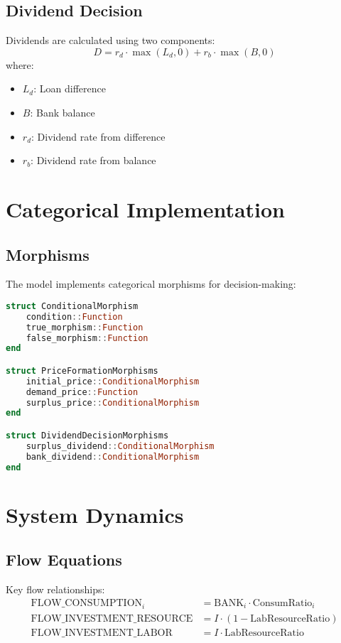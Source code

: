 \documentclass{article}
\begin{document}
\subsection{Dividend Decision}
Dividends are calculated using two components:
\begin{equation}
    D = r_d \cdot \max(L_d, 0) + r_b \cdot \max(B, 0)
\end{equation}
where:
\begin{itemize}
    \item $L_d$: Loan difference
    \item $B$: Bank balance
    \item $r_d$: Dividend rate from difference
    \item $r_b$: Dividend rate from balance
\end{itemize}

\section{Categorical Implementation}

\subsection{Morphisms}
The model implements categorical morphisms for decision-making:

\begin{lstlisting}[language=Julia]
struct ConditionalMorphism
    condition::Function
    true_morphism::Function
    false_morphism::Function
end

struct PriceFormationMorphisms
    initial_price::ConditionalMorphism
    demand_price::Function
    surplus_price::ConditionalMorphism
end

struct DividendDecisionMorphisms
    surplus_dividend::ConditionalMorphism
    bank_dividend::ConditionalMorphism
end
\end{lstlisting}

\section{System Dynamics}

\subsection{Flow Equations}
Key flow relationships:
\begin{align*}
    \text{FLOW\_CONSUMPTION}_i &= \text{BANK}_i \cdot \text{ConsumRatio}_i \\
    \text{FLOW\_INVESTMENT\_RESOURCE} &= I \cdot (1 - \text{LabResourceRatio}) \\
    \text{FLOW\_INVESTMENT\_LABOR} &= I \cdot \text{LabResourceRatio}
\end{align*}
\end{document}
